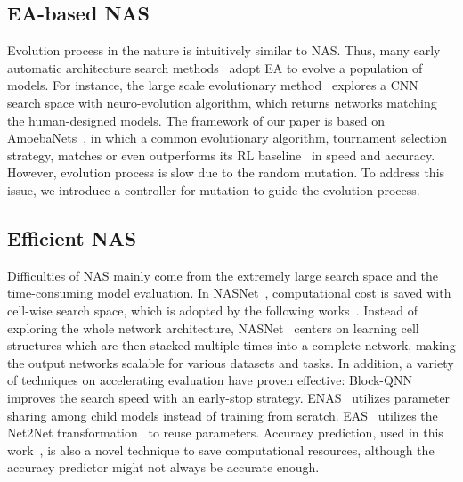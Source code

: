 \documentclass[10pt,twocolumn,letterpaper]{article}
\begin{document}
\subsection{EA-based NAS}
Evolution process in the nature is intuitively similar to NAS. Thus, many early automatic architecture search methods~\cite{miller1989designing,DBLP:journals/tnn/YaoL97,stanley2002evolving,real2017large,miikkulainen2017evolving,xie2017genetic} adopt EA to evolve a population of models. For instance, the large scale evolutionary method~\cite{real2017large} explores a CNN search space with neuro-evolution algorithm, which returns networks matching the human-designed models. The framework of our paper is based on AmoebaNets~\cite{Real2018Regularized}, in which a common evolutionary algorithm, tournament selection strategy, matches or even outperforms its RL baseline~\cite{zoph2017learning} in speed and accuracy. However, evolution process is slow due to the random mutation. To address this issue, we introduce a controller for mutation to guide the evolution process.

\subsection{Efficient NAS}
Difficulties of NAS mainly come from the extremely large search space and the time-consuming model evaluation. In NASNet~\cite{zoph2017learning}, computational cost is saved with cell-wise search space, which is adopted by the following works~\cite{Real2018Regularized,pham2018efficient,liu2017progressive}. Instead of exploring the whole network architecture, NASNet~\cite{zoph2017learning} centers on learning cell structures which are then stacked multiple times into a complete network, making the output networks scalable for various datasets and tasks.
In addition, a variety of techniques on accelerating evaluation have proven effective: Block-QNN~\cite{zhong2018practical} improves the search speed with an early-stop strategy. ENAS~\cite{pham2018efficient} utilizes parameter sharing among child models instead of training from scratch. EAS~\cite{cai2018efficient} utilizes the Net2Net transformation~\cite{chen2015net2net} to reuse parameters. Accuracy prediction, used in this work~\cite{baker2018accelerating}, is also a novel technique to save computational resources, although the accuracy predictor might not always be accurate enough. 
\end{document}
